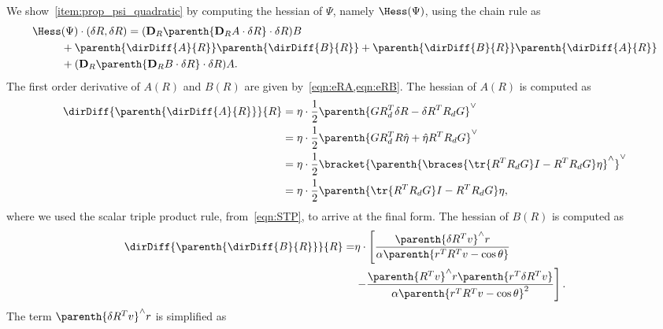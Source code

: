 We show~\cref{item:prop_psi_quadratic} by computing the hessian of \( \Psi \), namely \( \Hess(\Psi) \),  using the chain rule as 
\begin{align*}
    \Hess &(\Psi)\cdot (\delta R,\delta R)= (\mathbf{D}_R\parenth{\mathbf{D}_R A \cdot \delta R}\cdot \delta R) B\\
    & + \parenth{\dirDiff{A}{R} }\parenth{\dirDiff{B}{R}} 
    + \parenth{\dirDiff{B}{R} }\parenth{\dirDiff{A}{R}}\\ &+(\mathbf{D}_R\parenth{\mathbf{D}_R B \cdot \delta R}\cdot \delta R) A.
\end{align*}
The first order derivative of \( A(R) \) and \( B(R) \) are given by~\cref{eqn:eRA,eqn:eRB}. 
The hessian of \( A(R) \) is computed as 
\begin{align*}
    \dirDiff{\parenth{\dirDiff{A}{R}}}{R} &= \eta \cdot \frac{1}{2}\parenth{G R_d^T \delta R - \delta R^T R_d G}^\vee  \\
    &= \eta \cdot \frac{1}{2} \parenth{G R_d^T R \hat \eta + \hat \eta R^T R_d G}^\vee\\
    &= \eta \cdot \frac{1}{2} \bracket{\parenth{\braces{\tr{R^T R_d G} I - R^T R_d G} \eta}^\wedge}^\vee  \\
    &= \eta \cdot \frac{1}{2} \parenth{\tr{R^T R_d G} I - R^T R_d G}\eta ,
\end{align*}
where we used the scalar triple product rule, from~\cref{eqn:STP}, to arrive at the final form.
The hessian of \( B(R) \) is computed as
\begin{align*}
    \dirDiff{\parenth{\dirDiff{B}{R}}}{R} =& \eta \cdot \left[\frac{\parenth{\delta R^T v}^\wedge r}{\alpha\parenth{r^T R^T v - \cos \theta}} \right. \\
    & \left. - \frac{\parenth{R^T v}^\wedge r \parenth{r^T \delta R^T v}}{\alpha \parenth{r^TR^Tv - \cos \theta}^2}   \right] .
\end{align*}
The term \( \parenth{\delta R^T v}^\wedge r\) is simplified as

